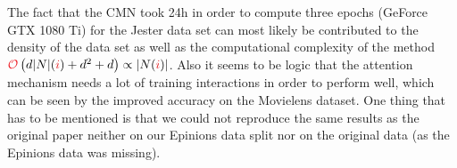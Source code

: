 The fact that the CMN took 24h in order to compute three epochs (GeForce GTX 1080 Ti) for the Jester data set can most likely be contributed to the density of the data set as well as the computational complexity of the method $\bigO\left(d\abs{N}(\idxi)+d^2+d\right)\propto\abs{N(\idxi)}$.
Also it seems to be logic that the attention mechanism needs a lot of training interactions in order to perform well, which can be seen by the improved accuracy on the Movielens dataset.
One thing that has to be mentioned is that we could not reproduce the same results as the original paper neither on our Epinions data split nor on the original data (as the Epinions data was missing).
